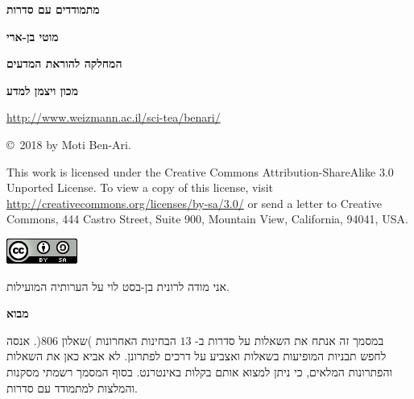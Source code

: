 \documentclass[12pt,a4paper]{article}
\begin{document}
\thispagestyle{empty}


\begin{center}
\textbf{\Huge מתמודדים עם סדרות}

\bigskip
\bigskip

\textbf{\Large מוטי בן-ארי}

\bigskip

\textbf{\Large המחלקה להוראת המדעים}

\bigskip

\textbf{\Large מכון ויצמן למדע}

\bigskip

\url{http://www.weizmann.ac.il/sci-tea/benari/}

\bigskip

\end{center}


\begin{center}
\copyright{}\  2018 by Moti Ben-Ari.
\end{center}

\begin{footnotesize}
This work is licensed under the Creative Commons Attribution-ShareAlike 3.0 Unported License. To view a copy of this license, visit \url{http://creativecommons.org/licenses/by-sa/3.0/} or send a letter to Creative Commons, 444 Castro Street, Suite 900, Mountain View, California, 94041, USA.
\end{footnotesize}

\bigskip

\begin{center}
\includegraphics[width=.2\textwidth]{../by-sa.png}
\end{center}

\bigskip
\bigskip
\bigskip


אני מודה לרונית בן-בסט לוי על הערותיה המועילות.
\newpage

\begin{center}
\textbf{מבוא}
\end{center}

במסמך זה אנתח את השאלות על סדרות ב-%
$13$
הבחינות האחרונות )שאלון
$806$(.
אנסה לחפש תבניות המופיעות בשאלות ואצביע על דרכים לפתרונן. לא אביא כאן את השאלות והפתרונות המלאים, כי ניתן למצוא אותם בקלות באינטרנט. בסוף המסמך רשמתי מסקנות והמלצות למתמודד עם סדרות.
\end{document}
